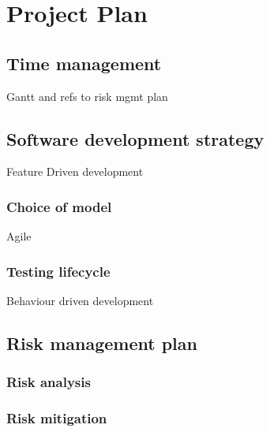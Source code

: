 \chapter{Project Plan}
\label{chap:project-plan}

\section{Time management}
Gantt and refs to risk mgmt plan
\section{Software development strategy}
Feature Driven development
\subsection{Choice of model}
Agile
\subsection{Testing lifecycle}
Behaviour driven development
\section{Risk management plan}
\subsection{Risk analysis}
\subsection{Risk mitigation}